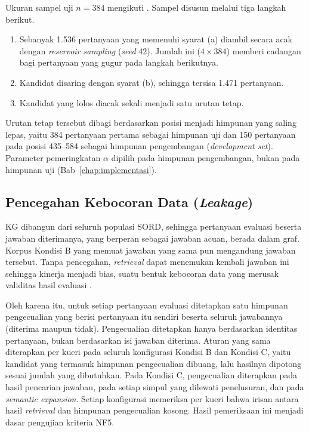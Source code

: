 Ukuran sampel uji $n{=}384$ mengikuti \textcite{DaSilva2025}. Sampel disusun melalui tiga langkah berikut.
\begin{enumerate}
    \item Sebanyak 1.536 pertanyaan yang memenuhi syarat (a) diambil secara acak dengan \emph{reservoir sampling} (\emph{seed} 42). Jumlah ini ($4 \times 384$) memberi cadangan bagi pertanyaan yang gugur pada langkah berikutnya.
    \item Kandidat disaring dengan syarat (b), sehingga tersisa 1.471 pertanyaan.
    \item Kandidat yang lolos diacak sekali menjadi satu urutan tetap.
\end{enumerate}

Urutan tetap tersebut dibagi berdasarkan posisi menjadi himpunan yang saling lepas, yaitu 384 pertanyaan pertama sebagai himpunan uji dan 150 pertanyaan pada posisi 435--584 sebagai himpunan pengembangan (\emph{development set}). Parameter pemeringkatan $\alpha$ dipilih pada himpunan pengembangan, bukan pada himpunan uji (Bab~\ref{chap:implementasi}).

\subsection{Pencegahan Kebocoran Data (\emph{Leakage})}
\label{subsec:leakage}

KG dibangun dari seluruh populasi SORD, sehingga pertanyaan evaluasi beserta jawaban diterimanya, yang berperan sebagai jawaban acuan, berada dalam graf. Korpus Kondisi B yang memuat jawaban yang sama pun mengandung jawaban tersebut. Tanpa pencegahan, \emph{retrieval} dapat menemukan kembali jawaban ini sehingga kinerja menjadi bias, suatu bentuk kebocoran data yang merusak validitas hasil evaluasi \autocite{Kapoor2023}.

Oleh karena itu, untuk setiap pertanyaan evaluasi ditetapkan satu himpunan pengecualian yang berisi pertanyaan itu sendiri beserta seluruh jawabannya (diterima maupun tidak). Pengecualian ditetapkan hanya berdasarkan identitas pertanyaan, bukan berdasarkan isi jawaban diterima. Aturan yang sama diterapkan per kueri pada seluruh konfigurasi Kondisi B dan Kondisi C, yaitu kandidat yang termasuk himpunan pengecualian dibuang, lalu hasilnya dipotong sesuai jumlah yang dibutuhkan. Pada Kondisi C, pengecualian diterapkan pada hasil pencarian jawaban, pada setiap simpul yang dilewati penelusuran, dan pada \emph{semantic expansion}. Setiap konfigurasi memeriksa per kueri bahwa irisan antara hasil \emph{retrieval} dan himpunan pengecualian kosong. Hasil pemeriksaan ini menjadi dasar pengujian kriteria NF5.

